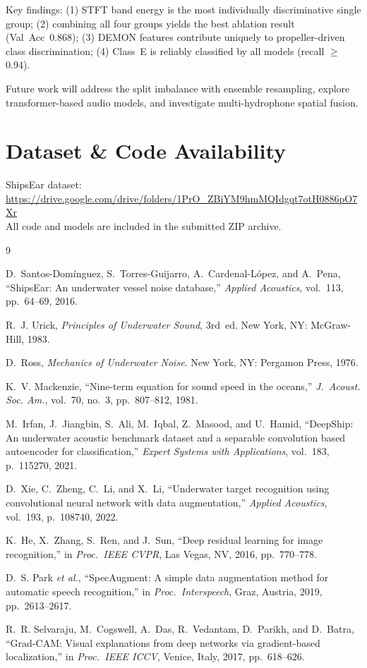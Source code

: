 \documentclass[conference]{IEEEtran}
\begin{document}
Key findings: (1) STFT band energy is the most individually discriminative
single group; (2) combining all four groups yields the best ablation
result (Val~Acc~0.868); (3) DEMON features contribute uniquely to
propeller-driven class discrimination; (4) Class~E is reliably classified
by all models (recall $\geq$0.94).

Future work will address the split imbalance with ensemble resampling,
explore transformer-based audio models, and investigate multi-hydrophone
spatial fusion.

\section*{Dataset \& Code Availability}

ShipsEar dataset:
\url{https://drive.google.com/drive/folders/1PrO_ZBiYM9hmMQIdgqt7otH0886pO7Xr}\\
All code and models are included in the submitted ZIP archive.

\balance

\begin{thebibliography}{9}

D.~Santos-Dom\'inguez, S.~Torres-Guijarro, A.~Cardenal-L\'opez, and A.~Pena,
``ShipsEar: An underwater vessel noise database,''
\textit{Applied Acoustics}, vol.~113, pp.~64--69, 2016.

R.~J. Urick,
\textit{Principles of Underwater Sound}, 3rd~ed.
New York, NY: McGraw-Hill, 1983.

D.~Ross,
\textit{Mechanics of Underwater Noise}.
New York, NY: Pergamon Press, 1976.

K.~V. Mackenzie,
``Nine-term equation for sound speed in the oceans,''
\textit{J.~Acoust. Soc. Am.}, vol.~70, no.~3, pp.~807--812, 1981.

M.~Irfan, J.~Jiangbin, S.~Ali, M.~Iqbal, Z.~Masood, and U.~Hamid,
``DeepShip: An underwater acoustic benchmark dataset and a separable
convolution based autoencoder for classification,''
\textit{Expert Systems with Applications}, vol.~183, p.~115270, 2021.

D.~Xie, C.~Zheng, C.~Li, and X.~Li,
``Underwater target recognition using convolutional neural network
with data augmentation,''
\textit{Applied Acoustics}, vol.~193, p.~108740, 2022.

K.~He, X.~Zhang, S.~Ren, and J.~Sun,
``Deep residual learning for image recognition,''
in \textit{Proc.\ IEEE CVPR}, Las Vegas, NV, 2016, pp.~770--778.

D.~S. Park \textit{et al.},
``SpecAugment: A simple data augmentation method for automatic speech
recognition,''
in \textit{Proc.\ Interspeech}, Graz, Austria, 2019, pp.~2613--2617.

R.~R. Selvaraju, M.~Cogswell, A.~Das, R.~Vedantam, D.~Parikh, and D.~Batra,
``Grad-CAM: Visual explanations from deep networks via gradient-based
localization,''
in \textit{Proc.\ IEEE ICCV}, Venice, Italy, 2017, pp.~618--626.

\end{thebibliography}
\end{document}
